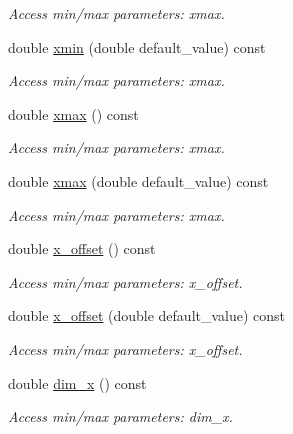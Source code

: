 \begin{DoxyCompactItemize}
\begin{DoxyCompactList}\small\item\em Access min/max parameters: xmax. \item\end{DoxyCompactList}\item 
double \hyperlink{struct_d_d4hep_1_1_x_m_l_1_1_dimension_a7438d71031628c93135a3e3d9c853d64}{xmin} (double default\_\-value) const 
\begin{DoxyCompactList}\small\item\em Access min/max parameters: xmax. \item\end{DoxyCompactList}\item 
double \hyperlink{struct_d_d4hep_1_1_x_m_l_1_1_dimension_a39e1560dbd3dfb28b71b372fc07ae9a2}{xmax} () const 
\begin{DoxyCompactList}\small\item\em Access min/max parameters: xmax. \item\end{DoxyCompactList}\item 
double \hyperlink{struct_d_d4hep_1_1_x_m_l_1_1_dimension_ab7f08df40c6c910371be2866eda0f81a}{xmax} (double default\_\-value) const 
\begin{DoxyCompactList}\small\item\em Access min/max parameters: xmax. \item\end{DoxyCompactList}\item 
double \hyperlink{struct_d_d4hep_1_1_x_m_l_1_1_dimension_a648a3e31215a3e8e839b1af4fecc4f94}{x\_\-offset} () const 
\begin{DoxyCompactList}\small\item\em Access min/max parameters: x\_\-offset. \item\end{DoxyCompactList}\item 
double \hyperlink{struct_d_d4hep_1_1_x_m_l_1_1_dimension_ada6fb7d6c8d3fc8dbdd1ca3f6e919062}{x\_\-offset} (double default\_\-value) const 
\begin{DoxyCompactList}\small\item\em Access min/max parameters: x\_\-offset. \item\end{DoxyCompactList}\item 
double \hyperlink{struct_d_d4hep_1_1_x_m_l_1_1_dimension_a643e3deada8984ade3cf833ad125e894}{dim\_\-x} () const 
\begin{DoxyCompactList}\small\item\em Access min/max parameters: dim\_\-x. \item\end{DoxyCompactList}\item 

\end{DoxyCompactItemize}
